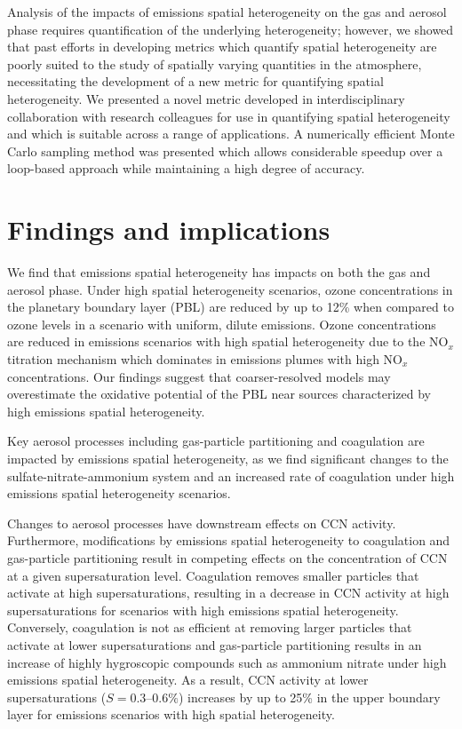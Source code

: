 Analysis of the impacts of emissions spatial heterogeneity on the gas and aerosol phase requires quantification of the underlying heterogeneity; however, we showed that past efforts in developing metrics which quantify spatial heterogeneity are poorly suited to the study of spatially varying quantities in the atmosphere, necessitating the development of a new metric for quantifying spatial heterogeneity. We presented a novel metric developed in interdisciplinary collaboration with research colleagues for use in quantifying spatial heterogeneity and which is suitable across a range of applications. A numerically efficient Monte Carlo sampling method was presented which allows considerable speedup over a loop-based approach while maintaining a high degree of accuracy. 

\section{Findings and implications}

We find that emissions spatial heterogeneity has impacts on both the gas and aerosol phase. Under high spatial heterogeneity scenarios, ozone concentrations in the planetary boundary layer (PBL) are reduced by up to 12\% when compared to ozone levels in a scenario with uniform, dilute emissions. Ozone concentrations are reduced in emissions scenarios with high spatial heterogeneity due to the NO$_x$ titration mechanism which dominates in emissions plumes with high NO$_x$ concentrations. Our findings suggest that coarser-resolved models may overestimate the oxidative potential of the PBL near sources characterized by high emissions spatial heterogeneity. 

Key aerosol processes including gas-particle partitioning and coagulation are impacted by emissions spatial heterogeneity, as we find significant changes to the sulfate-nitrate-ammonium system and an increased rate of coagulation under high emissions spatial heterogeneity scenarios. 

Changes to aerosol processes have downstream effects on CCN activity. Furthermore, modifications by emissions spatial heterogeneity to coagulation and gas-particle partitioning result in competing effects on the concentration of CCN at a given supersaturation level. Coagulation removes smaller particles that activate at high supersaturations, resulting in a decrease in CCN activity at high supersaturations for scenarios with high emissions spatial heterogeneity. Conversely, coagulation is not as efficient at removing larger particles that activate at lower supersaturations and gas-particle partitioning results in an increase of highly hygroscopic compounds such as ammonium nitrate under high emissions spatial heterogeneity. As a result, CCN activity at lower supersaturations ($S=0.3\mbox{--}0.6\%$) increases by up to 25\% in the upper boundary layer for emissions scenarios with high spatial heterogeneity. 

